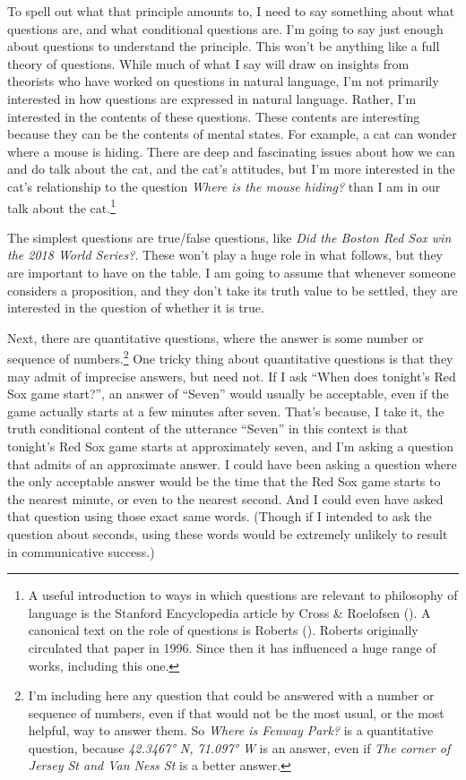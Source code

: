 \documentclass[
  12pt,
  letterpaper,
]{scrbook}
\begin{document}
To spell out what that principle amounts to, I need to say something
about what questions are, and what conditional questions are. I'm going
to say just enough about questions to understand the principle. This
won't be anything like a full theory of questions. While much of what I
say will draw on insights from theorists who have worked on questions in
natural language, I'm not primarily interested in how questions are
expressed in natural language. Rather, I'm interested in the contents of
these questions. These contents are interesting because they can be the
contents of mental states. For example, a cat can wonder where a mouse
is hiding. There are deep and fascinating issues about how we can and do
talk about the cat, and the cat's attitudes, but I'm more interested in
the cat's relationship to the question \emph{Where is the mouse hiding?}
than I am in our talk about the cat.\footnote{A useful introduction to
  ways in which questions are relevant to philosophy of language is the
  Stanford Encyclopedia article by Cross \& Roelofsen
  (). A canonical text on the role of
  questions is Roberts (). Roberts
  originally circulated that paper in 1996. Since then it has influenced
  a huge range of works, including this one.}

The simplest questions are true/false questions, like \emph{Did the
Boston Red Sox win the 2018 World Series?}. These won't play a huge role
in what follows, but they are important to have on the table. I am going
to assume that whenever someone considers a proposition, and they don't
take its truth value to be settled, they are interested in the question
of whether it is true.

Next, there are quantitative questions, where the answer is some number
or sequence of numbers.\footnote{I'm including here any question that
  could be answered with a number or sequence of numbers, even if that
  would not be the most usual, or the most helpful, way to answer them.
  So \emph{Where is Fenway Park?} is a quantitative question, because
  \emph{42.3467° N, 71.097° W} is an answer, even if \emph{The corner of
  Jersey St and Van Ness St} is a better answer.} One tricky thing about
quantitative questions is that they may admit of imprecise answers, but
need not. If I ask ``When does tonight's Red Sox game start?'', an
answer of ``Seven'' would usually be acceptable, even if the game
actually starts at a few minutes after seven. That's because, I take it,
the truth conditional content of the utterance ``Seven'' in this context
is that tonight's Red Sox game starts at approximately seven, and I'm
asking a question that admits of an approximate answer. I could have
been asking a question where the only acceptable answer would be the
time that the Red Sox game starts to the nearest minute, or even to the
nearest second. And I could even have asked that question using those
exact same words. (Though if I intended to ask the question about
seconds, using these words would be extremely unlikely to result in
communicative success.)
\end{document}
